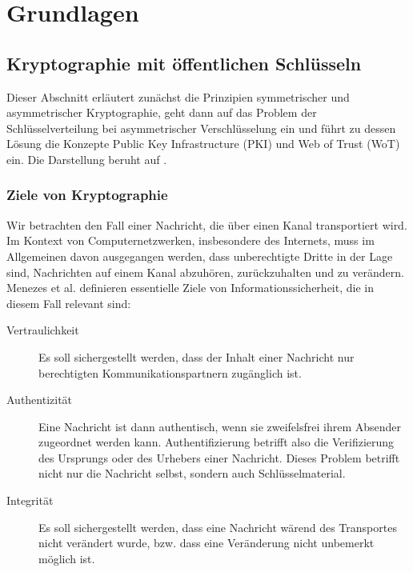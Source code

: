 
\chapter{Grundlagen}
\label{ch:Grundlagen}

\section{Kryptographie mit öffentlichen Schlüsseln}
\label{ch:Grundlagen:sec:PublicKeyCrypto}

Dieser Abschnitt erl\"autert zun\"achst die Prinzipien symmetrischer
und asymmetrischer Kryptographie, geht dann auf das Problem der
Schl\"usselverteilung bei asymmetrischer Verschl\"usselung ein und
f\"uhrt zu dessen L\"osung die Konzepte Public Key Infrastructure
(PKI) und Web of Trust (WoT) ein. Die Darstellung beruht auf
\cite{Menezes1996}.

\subsection{Ziele von Kryptographie}
\label{sec:ziele-von-krypt}

Wir betrachten den Fall einer Nachricht, die \"uber einen Kanal
transportiert wird. Im Kontext von Computernetzwerken, insbesondere
des Internets, muss im Allgemeinen davon ausgegangen werden, dass
unberechtigte Dritte in der Lage sind, Nachrichten auf einem Kanal
abzuh\"oren, zur\"uckzuhalten und zu ver\"andern. Menezes et
al. \cite{Menezes1996} definieren essentielle Ziele von
Informationssicherheit, die in diesem Fall relevant sind:

\begin{description}
\item[Vertraulichkeit] Es soll sichergestellt werden, dass der Inhalt
  einer Nachricht nur berechtigten Kommunikationspartnern zug\"anglich
  ist.
\item[Authentizit\"at] Eine Nachricht ist dann authentisch, wenn sie
  zweifelsfrei ihrem Absender zugeordnet werden
  kann. Authentifizierung betrifft also die Verifizierung des
  Ursprungs oder des Urhebers einer Nachricht. Dieses Problem betrifft
  nicht nur die Nachricht selbst, sondern auch Schl\"usselmaterial.
\item[Integrit\"at] Es soll sichergestellt werden, dass eine Nachricht
  w\"arend des Transportes nicht ver\"andert wurde, bzw. dass eine
  Ver\"anderung nicht unbemerkt m\"oglich ist.
\end{description}

